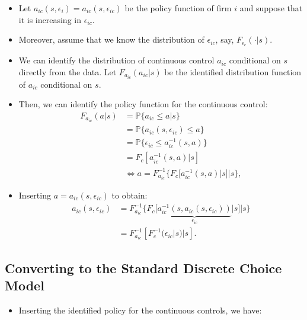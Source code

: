 \documentclass[
]{book}
\providecommand{\tightlist}{%
  \setlength{\itemsep}{0pt}\setlength{\parskip}{0pt}}
\begin{document}
\begin{itemize}
\tightlist
\item
  Let \(a_{ic}(s, \epsilon_{i}) = a_{ic}(s, \epsilon_{ic})\) be the policy function of firm \(i\) and suppose that it is increasing in \(\epsilon_{ic}\).
\item
  Moreover, assume that we know the distribution of \(\epsilon_{ic}\), say, \(F_{\epsilon_c}(\cdot|s)\).
\item
  We can identify the distribution of continuous control \(a_{ic}\) conditional on \(s\) directly from the data. Let \(F_{a_{ic}}(a_{ic}|s)\) be the identified distribution function of \(a_{ic}\) conditional on \(s\).
\item
  Then, we can identify the policy function for the continuous control:
  \begin{equation}
  \begin{split}
  F_{a_{ic}}(a|s) &= \mathbb{P}\{a_{ic} \le a|s\}\\
  &= \mathbb{P}\{a_{ic}(s, \epsilon_{ic}) \le a\}\\
  &=\mathbb{P}\{\epsilon_{ic} \le a_{ic}^{-1}(s, a)\}\\
  &=F_c[a_{ic}^{-1}(s, a)|s]\\
  &\Leftrightarrow a = F_{a_{ic}}^{-1}\{F_c[a_{ic}^{-1}(s, a)|s]|s\},
  \end{split}
  \end{equation}
\item
  Inserting \(a = a_{ic}(s, \epsilon_{ic})\) to obtain:
  \begin{equation}
  \begin{split}
  a_{ic}(s, \epsilon_{ic}) &= F_{a_{ic}}^{-1}\{F_c[\underbrace{a_{ic}^{-1}(s, a_{ic}(s, \epsilon_{ic}))}_{\epsilon_{ic}}|s]|s\}\\
  & = F_{a_{ic}}^{-1}[F_c^{-1}(\epsilon_{ic}|s)|s].
  \end{split}
  \end{equation}
\end{itemize}

\hypertarget{converting-to-the-standard-discrete-choice-model}{%
\subsection{Converting to the Standard Discrete Choice Model}\label{converting-to-the-standard-discrete-choice-model}}

\begin{itemize}
\tightlist
\item
  Inserting the identified policy for the continuous controls, we have:
\end{itemize}
\end{document}
